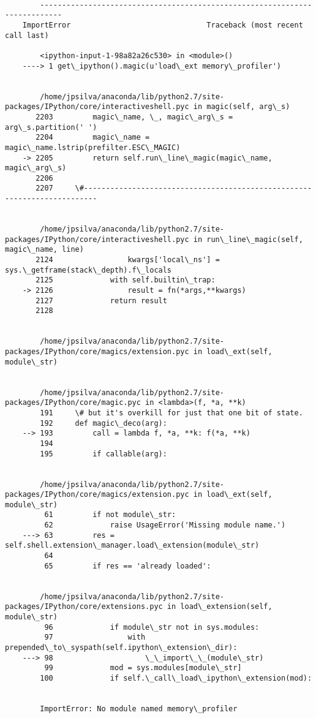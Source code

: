 \documentclass{article}
\begin{document}
    \begin{Verbatim}[commandchars=\\\{\}]

        ---------------------------------------------------------------------------
    ImportError                               Traceback (most recent call last)

        <ipython-input-1-98a82a26c530> in <module>()
    ----> 1 get\_ipython().magic(u'load\_ext memory\_profiler')
    

        /home/jpsilva/anaconda/lib/python2.7/site-packages/IPython/core/interactiveshell.pyc in magic(self, arg\_s)
       2203         magic\_name, \_, magic\_arg\_s = arg\_s.partition(' ')
       2204         magic\_name = magic\_name.lstrip(prefilter.ESC\_MAGIC)
    -> 2205         return self.run\_line\_magic(magic\_name, magic\_arg\_s)
       2206 
       2207     \#-------------------------------------------------------------------------


        /home/jpsilva/anaconda/lib/python2.7/site-packages/IPython/core/interactiveshell.pyc in run\_line\_magic(self, magic\_name, line)
       2124                 kwargs['local\_ns'] = sys.\_getframe(stack\_depth).f\_locals
       2125             with self.builtin\_trap:
    -> 2126                 result = fn(*args,**kwargs)
       2127             return result
       2128 


        /home/jpsilva/anaconda/lib/python2.7/site-packages/IPython/core/magics/extension.pyc in load\_ext(self, module\_str)


        /home/jpsilva/anaconda/lib/python2.7/site-packages/IPython/core/magic.pyc in <lambda>(f, *a, **k)
        191     \# but it's overkill for just that one bit of state.
        192     def magic\_deco(arg):
    --> 193         call = lambda f, *a, **k: f(*a, **k)
        194 
        195         if callable(arg):


        /home/jpsilva/anaconda/lib/python2.7/site-packages/IPython/core/magics/extension.pyc in load\_ext(self, module\_str)
         61         if not module\_str:
         62             raise UsageError('Missing module name.')
    ---> 63         res = self.shell.extension\_manager.load\_extension(module\_str)
         64 
         65         if res == 'already loaded':


        /home/jpsilva/anaconda/lib/python2.7/site-packages/IPython/core/extensions.pyc in load\_extension(self, module\_str)
         96             if module\_str not in sys.modules:
         97                 with prepended\_to\_syspath(self.ipython\_extension\_dir):
    ---> 98                     \_\_import\_\_(module\_str)
         99             mod = sys.modules[module\_str]
        100             if self.\_call\_load\_ipython\_extension(mod):


        ImportError: No module named memory\_profiler

    \end{Verbatim}
\end{document}
